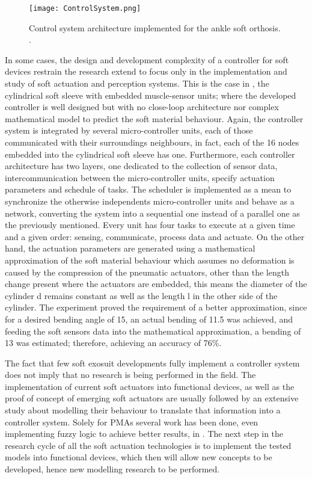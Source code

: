 \begin{figure}[hbtp!]
    \centering
    \texttt{[image: ControlSystem.png]}
    \caption{Control system architecture implemented for the ankle soft orthosis. \cite{park2011bio}. }
    \label{fig:control_system}
\end{figure}

In some cases, the design and development complexity of a controller for soft devices restrain the research extend to focus only in the implementation and study of soft actuation and perception systems. This is the case in \cite{Park2012}, the cylindrical soft sleeve with embedded muscle-sensor units; where the developed controller is well designed but with no close-loop architecture nor complex mathematical model to predict the soft material behaviour. Again, the controller system is integrated by several micro-controller units, each of those communicated with their surroundings neighbours, in fact, each of the 16 nodes embedded into the cylindrical soft sleeve has one. Furthermore, each controller architecture has two layers, one dedicated to the collection of sensor data, intercommunication between the micro-controller units, specify actuation parameters and schedule of tasks. The scheduler is implemented as a mean to synchronize the otherwise independents micro-controller units and behave as a network, converting the system into a sequential one instead of a parallel one as the previously mentioned. Every unit has four tasks to execute at a given time and a given order: sensing, communicate, process data and actuate. On the other hand, the actuation parameters are generated using a mathematical approximation of the soft material behaviour which assumes no deformation is caused by the compression of the pneumatic actuators, other than the length change present where the actuators are embedded, this means the diameter of the cylinder d remains constant as well as the length l in the other side of the cylinder. The experiment proved the requirement of a better approximation, since for a desired bending angle of 15\textdegree{}, an actual bending of 11.5\textdegree{} was achieved, and feeding the soft sensors data into the mathematical approximation, a bending of 13\textdegree{} was estimated; therefore, achieving an accuracy of 76\%.

The fact that few soft exosuit developments fully implement a controller system does not imply that no research is being performed in the field. The implementation of current soft actuators into functional devices, as well as the proof of concept of emerging soft actuators are usually followed by an extensive study about modelling their behaviour to translate that information into a controller system. Solely for PMAs several work has been done, even implementing fuzzy logic to achieve better results, in \cite{Chang2015,Skorina2015,Bishop-Moser2015,Hosovsky2016}. The next step in the research cycle of all the soft actuation technologies is to implement the tested models into functional devices, which then will allow new concepts to be developed, hence new modelling research to be performed.

